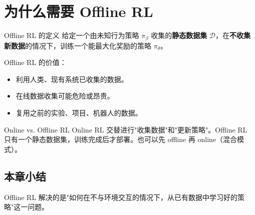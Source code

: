 \section{为什么需要 Offline RL}

\begin{importantbox}{Offline RL 的定义}
给定一个由未知行为策略 $\pi_\beta$ 收集的\textbf{静态数据集} $\mathcal{D}$，在\textbf{不收集新数据}的情况下，训练一个能最大化奖励的策略 $\pi_\theta$。
\end{importantbox}

Offline RL 的价值：
\begin{itemize}
    \item 利用人类、现有系统已收集的数据。
    \item 在线数据收集可能危险或昂贵。
    \item 复用之前的实验、项目、机器人的数据。
\end{itemize}

\begin{knowledgebox}{Online vs. Offline RL}
Online RL 交替进行"收集数据"和"更新策略"。Offline RL 只有一个静态数据集，训练完成后才部署。也可以先 offline 再 online（混合模式）。
\end{knowledgebox}

\subsection{本章小结}

Offline RL 解决的是"如何在不与环境交互的情况下，从已有数据中学习好的策略"这一问题。

